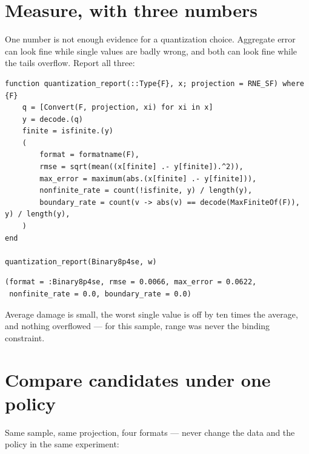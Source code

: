 \section{Measure, with three numbers}



\label{3943201719433937344}{}


One number is not enough evidence for a quantization choice. Aggregate error can look fine while single values are badly wrong, and both can look fine while the tails overflow. Report all three:




\nopagebreak[4]
\begin{minipage}{\linewidth}
\begin{verbatim}
function quantization_report(::Type{F}, x; projection = RNE_SF) where {F}
    q = [Convert(F, projection, xi) for xi in x]
    y = decode.(q)
    finite = isfinite.(y)
    (
        format = formatname(F),
        rmse = sqrt(mean((x[finite] .- y[finite]).^2)),
        max_error = maximum(abs.(x[finite] .- y[finite])),
        nonfinite_rate = count(!isfinite, y) / length(y),
        boundary_rate = count(v -> abs(v) == decode(MaxFiniteOf(F)), y) / length(y),
    )
end

quantization_report(Binary8p4se, w)
\end{verbatim}




\begin{verbatim}
(format = :Binary8p4se, rmse = 0.0066, max_error = 0.0622,
 nonfinite_rate = 0.0, boundary_rate = 0.0)
\end{verbatim}
\end{minipage}




Average damage is small, the worst single value is off by ten times the average, and nothing overflowed — for this sample, range was never the binding constraint.



\section{Compare candidates under one policy}



\label{4920482121782597622}{}


Same sample, same projection, four formats — never change the data and the policy in the same experiment:




